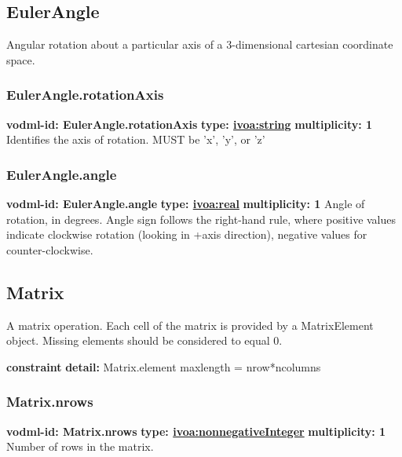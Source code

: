   \subsection{EulerAngle}
  \label{sect:EulerAngle}
    Angular rotation about a particular axis of a 3-dimensional cartesian coordinate space.

    \subsubsection{EulerAngle.rotationAxis}
      \textbf{vodml-id: EulerAngle.rotationAxis} \newline
      \textbf{type: \hyperref[sect:ivoa]{ivoa:string}} \newline
      \textbf{multiplicity: 1} \newline 
      Identifies the axis of rotation. MUST be 'x', 'y', or 'z'

    \subsubsection{EulerAngle.angle}
      \textbf{vodml-id: EulerAngle.angle} \newline
      \textbf{type: \hyperref[sect:ivoa]{ivoa:real}} \newline
      \textbf{multiplicity: 1} \newline 
      Angle of rotation, in degrees. Angle sign follows the right-hand rule, where positive values indicate clockwise rotation (looking in +axis direction), negative values for counter-clockwise.

  \subsection{Matrix}
  \label{sect:Matrix}
    A matrix operation. Each cell of the matrix is provided by a MatrixElement object. Missing elements should be considered to equal 0.

    \noindent \textbf{constraint} \newline
    \indent    \textbf{detail:} Matrix.element maxlength = nrow*ncolumns \newline


    \subsubsection{Matrix.nrows}
      \textbf{vodml-id: Matrix.nrows} \newline
      \textbf{type: \hyperref[sect:ivoa]{ivoa:nonnegativeInteger}} \newline
      \textbf{multiplicity: 1} \newline 
      Number of rows in the matrix.

